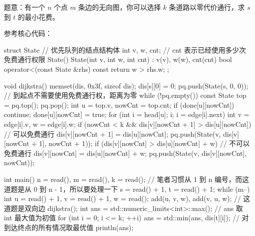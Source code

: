 题意：有一个 $n$ 个点 $m$ 条边的无向图，你可以选择 $k$ 条道路以零代价通行，求 $s$ 到 $t$ 的最小花费。

参考核心代码：

\begin{cppcode}
struct State {    // 优先队列的结点结构体
  int v, w, cnt;  // cnt 表示已经使用多少次免费通行权限
  State() {}
  State(int v, int w, int cnt) : v(v), w(w), cnt(cnt) {}
  bool operator<(const State &rhs) const { return w > rhs.w; }
};

void dijkstra() {
  memset(dis, 0x3f, sizeof dis);
  dis[s][0] = 0;
  pq.push(State(s, 0, 0));  // 到起点不需要使用免费通行权，距离为零
  while (!pq.empty()) {
    const State top = pq.top();
    pq.pop();
    int u = top.v, nowCnt = top.cnt;
    if (done[u][nowCnt]) continue;
    done[u][nowCnt] = true;
    for (int i = head[u]; i; i = edge[i].next) {
      int v = edge[i].v, w = edge[i].w;
      if (nowCnt < k && dis[v][nowCnt + 1] > dis[u][nowCnt]) {  // 可以免费通行
        dis[v][nowCnt + 1] = dis[u][nowCnt];
        pq.push(State(v, dis[v][nowCnt + 1], nowCnt + 1));
      }
      if (dis[v][nowCnt] > dis[u][nowCnt] + w) {  // 不可以免费通行
        dis[v][nowCnt] = dis[u][nowCnt] + w;
        pq.push(State(v, dis[v][nowCnt], nowCnt));
      }
    }
  }
}

int main() {
  n = read(), m = read(), k = read();
  // 笔者习惯从 1 到 n 编号，而这道题是从 0 到 n - 1，所以要处理一下
  s = read() + 1, t = read() + 1;
  while (m--) {
    int u = read() + 1, v = read() + 1, w = read();
    add(u, v, w), add(v, u, w);  // 这道题是双向边
  }
  dijkstra();
  int ans = std::numeric_limits<int>::max();  // ans 取 int 最大值为初值
  for (int i = 0; i <= k; ++i)
    ans = std::min(ans, dis[t][i]);  // 对到达终点的所有情况取最优值
  println(ans);
}
\end{cppcode}
